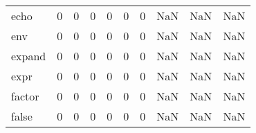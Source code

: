 \begin{longtable}{lrrrrrrrrr}
echo      &                                                  0 &                                                  0 &                                                  0 &                                                  0 &                                                  0 &                                                  0 &                                                NaN &                                    NaN &                                  NaN \\
env       &                                                  0 &                                                  0 &                                                  0 &                                                  0 &                                                  0 &                                                  0 &                                                NaN &                                    NaN &                                  NaN \\
expand    &                                                  0 &                                                  0 &                                                  0 &                                                  0 &                                                  0 &                                                  0 &                                                NaN &                                    NaN &                                  NaN \\
expr      &                                                  0 &                                                  0 &                                                  0 &                                                  0 &                                                  0 &                                                  0 &                                                NaN &                                    NaN &                                  NaN \\
factor    &                                                  0 &                                                  0 &                                                  0 &                                                  0 &                                                  0 &                                                  0 &                                                NaN &                                    NaN &                                  NaN \\
false     &                                                  0 &                                                  0 &                                                  0 &                                                  0 &                                                  0 &                                                  0 &                                                NaN &                                    NaN &                                  NaN \\

\end{longtable}
